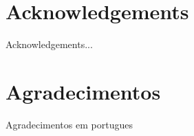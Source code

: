 \chapter*{Acknowledgements}

Acknowledgements...

\chapter*{Agradecimentos}

Agradecimentos em portugues

\clearpage
